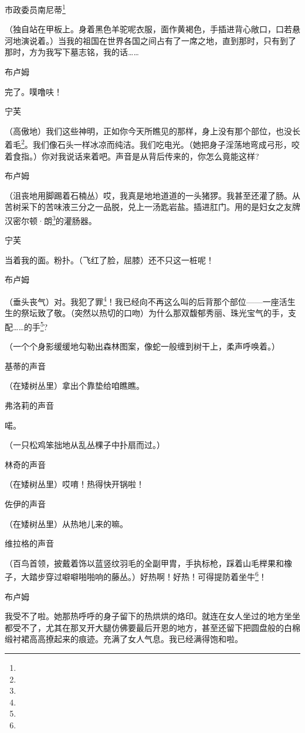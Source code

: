 \par 市政委员南尼蒂\footnote{}
\par （独自站在甲板上。身着黑色羊驼呢衣服，面作黄褐色，手插进背心敞口，口若悬河地演说着。）当我的祖国在世界各国之间占有了一席之地，直到那时，只有到了那时，方为我写下墓志铭，我的话……
\par 布卢姆
\par 完了。噗噜呋！
\par 宁芙
\par （高傲地）我们这些神明，正如你今天所瞧见的那样，身上没有那个部位，也没长着毛\footnote{}。我们像石头一样冰凉而纯洁。我们吃电光。（她把身子淫荡地弯成弓形，咬着食指。）你对我说话来着吧。声音是从背后传来的，你怎么竟能这样?
\par 布卢姆
\par （沮丧地用脚踢着石楠丛）哎，我真是地地道道的一头猪猡。我甚至还灌了肠。从苦树采下的苦味液三分之一品脱，兑上一汤匙岩盐。插进肛门。用的是妇女之友牌汉密尔顿·朗\footnote{}的灌肠器。
\par 宁芙
\par 当着我的面。粉扑。（飞红了脸，屈膝）还不只这一桩呢！
\par 布卢姆
\par （垂头丧气）对。我犯了罪\footnote{}！我已经向不再这么叫的后背那个部位——一座活生生的祭坛致了敬。（突然以热切的口吻）为什么那双馥郁秀丽、珠光宝气的手，支配……的手\footnote{}?
\par （一个个身影缓缓地勾勒出森林图案，像蛇一般缠到树干上，柔声呼唤着。）
\par 基蒂的声音
\par （在矮树丛里）拿出个靠垫给咱瞧瞧。
\par 弗洛莉的声音
\par 喏。
\par （一只松鸡笨拙地从乱丛棵子中扑扇而过。）
\par 林奇的声音
\par （在矮树丛里）哎唷！热得快开锅啦！
\par 佐伊的声音
\par （在矮树丛里）从热地儿来的嘛。
\par 维拉格的声音
\par （百鸟首领，披戴着饰以蓝竖纹羽毛的全副甲胄，手执标枪，踩着山毛榉果和橡子，大踏步穿过噼噼啪啪响的藤丛。）好热啊！好热！可得提防着坐牛\footnote{}！
\par 布卢姆
\par 我受不了啦。她那热呼呼的身子留下的热烘烘的烙印。就连在女人坐过的地方坐坐都受不了，尤其在那叉开大腿仿佛要最后开恩的地方，甚至还留下把圆盘般的白棉缎衬裙高高撩起来的痕迹。充满了女人气息。我已经满得饱和啦。
